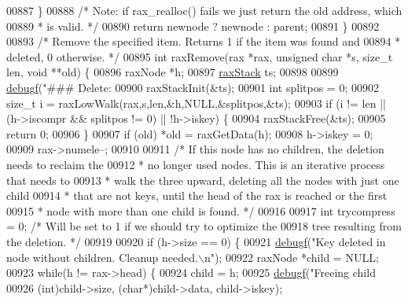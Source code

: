 \begin{DoxyCode}
{{{{{{{{{{{{{00887     \}
00888     \textcolor{comment}{/* Note: if rax\_realloc() fails we just return the old address, which}
00889 \textcolor{comment}{     * is valid. */}
00890     \textcolor{keywordflow}{return} newnode ? newnode : parent;
00891 \}
00892 
00893 \textcolor{comment}{/* Remove the specified item. Returns 1 if the item was found and}
00894 \textcolor{comment}{ * deleted, 0 otherwise. */}
00895 \textcolor{keywordtype}{int} raxRemove(rax *rax, \textcolor{keywordtype}{unsigned} \textcolor{keywordtype}{char} *s, size\_t len, \textcolor{keywordtype}{void} **old) \{
00896     raxNode *h;
00897     \hyperlink{structraxStack}{raxStack} ts;
00898 
00899     \hyperlink{rax_8c_a10b215c81aa397dbc44adfb3e436befb}{debugf}(\textcolor{stringliteral}{"### Delete: %
00900     raxStackInit(&ts);
00901     \textcolor{keywordtype}{int} splitpos = 0;
00902     size\_t i = raxLowWalk(rax,s,len,&h,NULL,&splitpos,&ts);
00903     \textcolor{keywordflow}{if} (i != len || (h->iscompr && splitpos != 0) || !h->iskey) \{
00904         raxStackFree(&ts);
00905         \textcolor{keywordflow}{return} 0;
00906     \}
00907     \textcolor{keywordflow}{if} (old) *old = raxGetData(h);
00908     h->iskey = 0;
00909     rax->numele--;
00910 
00911     \textcolor{comment}{/* If this node has no children, the deletion needs to reclaim the}
00912 \textcolor{comment}{     * no longer used nodes. This is an iterative process that needs to}
00913 \textcolor{comment}{     * walk the three upward, deleting all the nodes with just one child}
00914 \textcolor{comment}{     * that are not keys, until the head of the rax is reached or the first}
00915 \textcolor{comment}{     * node with more than one child is found. */}
00916 
00917     \textcolor{keywordtype}{int} trycompress = 0; \textcolor{comment}{/* Will be set to 1 if we should try to optimize the}
00918 \textcolor{comment}{                            tree resulting from the deletion. */}
00919 
00920     \textcolor{keywordflow}{if} (h->size == 0) \{
00921         \hyperlink{rax_8c_a10b215c81aa397dbc44adfb3e436befb}{debugf}(\textcolor{stringliteral}{"Key deleted in node without children. Cleanup needed.\(\backslash\)n"});
00922         raxNode *child = NULL;
00923         \textcolor{keywordflow}{while}(h != rax->head) \{
00924             child = h;
00925             \hyperlink{rax_8c_a10b215c81aa397dbc44adfb3e436befb}{debugf}(\textcolor{stringliteral}{"Freeing child %
00926                 (\textcolor{keywordtype}{int})child->size, (\textcolor{keywordtype}{char}*)child->data, child->iskey);
}}}}}}}}}}}}}}}
\end{DoxyCode}
